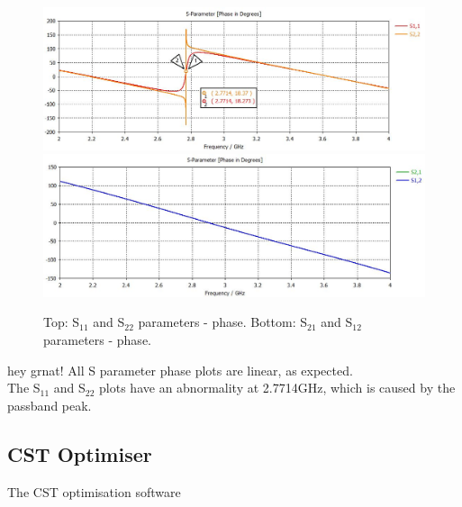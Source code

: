 \documentclass{paper}
\begin{document}
\begin{figure}[H]
	\centering
	\includegraphics[scale=0.4]{IMG/S11_and_S22_phase}
	\includegraphics[scale=0.4]{IMG/S21_and_S12_phase}
	\caption{Top: S$_{11}$ and S$_{22}$ parameters - phase. Bottom: S$_{21}$ and S$_{12}$ parameters - phase.}
	\label{fig:s11_s22_s21_s12_phase}
\end{figure}


hey grnat!
All S parameter phase plots are linear, as expected. \\

The S$_{11}$ and S$_{22}$ plots have an abnormality at 2.7714GHz, which is caused by the passband peak.\\

\subsection{CST Optimiser}
The CST optimisation software 
\end{document}
